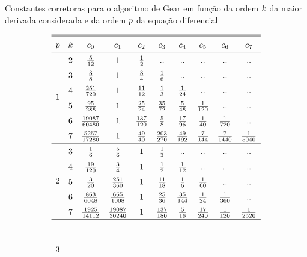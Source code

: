 \begin{table}[h]
	\caption{Constantes corretoras para o algoritmo de Gear em função da ordem \(k\) da maior derivada considerada e da ordem \(p\) da equação diferencial}
	\label{table:corrector_constants}

	\begin{equation*}
		\def\arraystretch{1.5}
		\begin{array}{cccccccccc}
	\hline
	\hline
		\eqOrder & \taylorOrder & c_0 & c_1 & c_2 & c_3 & c_4 & c_5 & c_6 & c_7 \\
	\hline
		\multirow{6}{*}{1} 
		& 2 & \frac{5}{12} & 1 & \frac{1}{2} & \emptyTableEntry & \emptyTableEntry & \emptyTableEntry & \emptyTableEntry & \emptyTableEntry \\
		& 3 & \frac{3}{8} & 1 & \frac{3}{4} & \frac{1}{6} & \emptyTableEntry & \emptyTableEntry & \emptyTableEntry & \emptyTableEntry \\
		& 4 & \frac{251}{720} & 1 & \frac{11}{12} & \frac{1}{3} & \frac{1}{24} & \emptyTableEntry & \emptyTableEntry & \emptyTableEntry \\
		& 5 & \frac{95}{288} & 1 & \frac{25}{24} & \frac{35}{72} & \frac{5}{48} & \frac{1}{120} & \emptyTableEntry & \emptyTableEntry \\
		& 6 & \frac{19087}{60480} & 1 & \frac{137}{120} & \frac{5}{8} & \frac{17}{96} & \frac{1}{40} & \frac{1}{720} & \emptyTableEntry \\
		& 7 & \frac{5257}{17280} & 1 & \frac{49}{40} & \frac{203}{270} & \frac{49}{192} & \frac{7}{144} & \frac{7}{1440} & \frac{1}{5040} \\
	\hline
		\multirow{5}{*}{2} 
		& 3 & \frac{1}{6} & \frac{5}{6} & 1 & \frac{1}{3} & \emptyTableEntry & \emptyTableEntry & \emptyTableEntry & \emptyTableEntry \\
		& 4 & \frac{19}{120} & \frac{3}{4} & 1 & \frac{1}{2} & \frac{1}{12} & \emptyTableEntry & \emptyTableEntry & \emptyTableEntry \\
		& 5 & \frac{3}{20} & \frac{251}{360} & 1 & \frac{11}{18} & \frac{1}{6} & \frac{1}{60} & \emptyTableEntry & \emptyTableEntry \\
		& 6 & \frac{863}{6048} & \frac{665}{1008} & 1 & \frac{25}{36} & \frac{35}{144} & \frac{1}{24} & \frac{1}{360} & \emptyTableEntry \\
		& 7 & \frac{1925}{14112} & \frac{19087}{30240} & 1 & \frac{137}{180} & \frac{5}{16} & \frac{17}{240} & \frac{1}{120} & \frac{1}{2520} \\
	\hline
		\multirow{4}{*}{3} 

\end{array}
\end{equation*}
\end{table}
